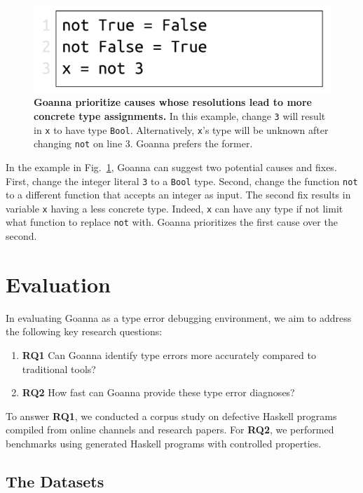 \documentclass[pdflatex,lineno,sn-nature,Numbered]{sn-jnl}%
\begin{document}
	
   \begin{figure}[ht!]
        \centering
        \includegraphics[width=0.5\linewidth]{images/Specificity}
        \caption[Goanna prioritize causes whose resolutions lead to more concrete type assignments]{\textbf{Goanna prioritize causes whose resolutions lead to more concrete type assignments.} In this example, change \texttt{3} will result in \texttt{x} to have type \texttt{Bool}. Alternatively, \texttt{x}'s type will be unknown after changing \texttt{not} on line 3. Goanna prefers the former.} 
        \label{fig:specificity}
    \end{figure}

    In the example in Fig.~\ref{fig:specificity}, Goanna can suggest two potential causes and fixes. First, change the integer literal \texttt{3} to a \texttt{Bool} type. Second, change the function \texttt{not} to a different function that accepts an integer as input. The second fix results in variable \texttt{x} having a less concrete type. Indeed, \texttt{x} can have any type if not limit what function to replace \texttt{not} with. Goanna prioritizes the first cause over the second. 

    
       
\section{Evaluation} \label{sec:evaluation}

In evaluating Goanna as a type error debugging environment, we aim to address the following key research questions:

\begin{enumerate}
    \item \textbf{RQ1} Can Goanna identify type errors more accurately compared to traditional tools?
    \item \textbf{RQ2} How fast can Goanna provide these type error diagnoses?
\end{enumerate}

To answer {\bf RQ1}, we conducted a corpus study on defective Haskell programs compiled from online channels and research papers. For {\bf RQ2}, we performed benchmarks using generated Haskell programs with controlled properties.

\subsection{The Datasets} \label{sub:dataset}
\end{document}
